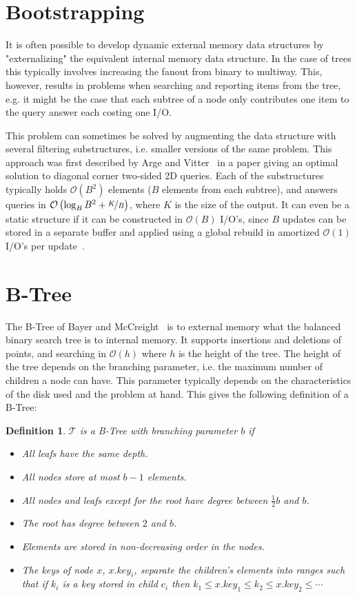 \documentclass[twoside,11pt,openright]{report}
\newtheorem{definition}{Definition}
\begin{document}
\section{Bootstrapping}
It is often possible to develop dynamic external memory data structures by "externalizing" the equivalent internal memory data structure. In the case of trees this typically involves increasing the fanout from binary to multiway. This, however, results in problems when searching and reporting items from the tree, e.g. it might be the case that each subtree of a node only contributes one item to the query answer each costing one I/O.

This problem can sometimes be solved by augmenting the data structure with several filtering substructures, i.e. smaller versions of the same problem. This approach was first described by Arge and Vitter~\cite{arge_vitter_2003} in a paper giving an optimal solution to diagonal corner two-sided 2D queries. Each of the substructures typically holds $\mathcal{O}(B^2)$ elements ($B$ elements from each subtree), and answers queries in $\mathcal{O}\left(\log_B B^2 + \nicefrac{K}{B}\right)$, where $K$ is the size of the output. It can even be a static structure if it can be constructed in $\mathcal{O}(B)$ I/O's, since $B$ updates can be stored in a separate buffer and applied using a global rebuild in amortized $\mathcal{O}(1)$ I/O's per update~\cite{vitter_2008}.

\section{B-Tree}
\label{sec:prelim_b_tree}
The B-Tree of Bayer and McCreight~\cite{bayer_mccreight_1972} is to external memory what the balanced binary search tree is to internal memory. It supports insertions and deletions of points, and searching in $\mathcal{O}(h)$ where $h$ is the height of the tree. The height of the tree depends on the branching parameter, i.e. the maximum number of children a node can have. This parameter typically depends on the characteristics of the disk used and the problem at hand. 
This gives the following definition of a B-Tree:

\begin{definition}
\label{def:btree}
$\mathcal{T}$ is a B-Tree with branching parameter $b$ if
\begin{itemize}
	\item All leafs have the same depth.
	\item All nodes store at most $b-1$ elements.
	\item All nodes and leafs except for the root have degree between $\frac{1}{2}b$ and $b$.
	\item The root has degree between $2$ and $b$.
	\item Elements are stored in non-decreasing order in the nodes.
	\item The keys of node $x$, $x.key_i$, separate the children's elements into ranges such that if $k_i$ is a key stored in child $c_i$ then $k_1 \leq x.key_1 \leq k_2 \leq x.key_2 \leq \cdots$
\end{itemize}
\end{definition}
\end{document}
